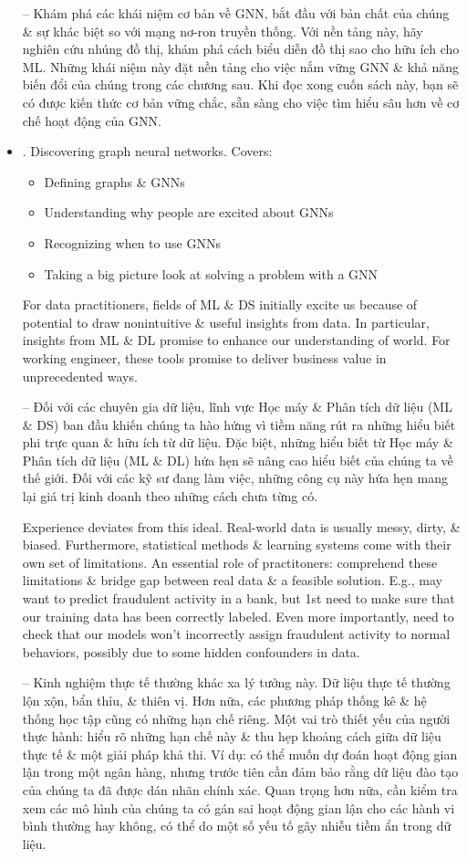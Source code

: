 \documentclass{article}
\begin{document}
\begin{itemize}
    -- Khám phá các khái niệm cơ bản về GNN, bắt đầu với bản chất của chúng \& sự khác biệt so với mạng nơ-ron truyền thống. Với nền tảng này, hãy nghiên cứu nhúng đồ thị, khám phá cách biểu diễn đồ thị sao cho hữu ích cho ML. Những khái niệm này đặt nền tảng cho việc nắm vững GNN \& khả năng biến đổi của chúng trong các chương sau. Khi đọc xong cuốn sách này, bạn sẽ có được kiến thức cơ bản vững chắc, sẵn sàng cho việc tìm hiểu sâu hơn về cơ chế hoạt động của GNN.
    \item {. Discovering graph neural networks.} Covers:
    \begin{itemize}
        \item Defining graphs \& GNNs
        \item Understanding why people are excited about GNNs
        \item Recognizing when to use GNNs
        \item Taking a big picture look at solving a problem with a GNN
    \end{itemize}
    For data practitioners, fields of ML \& DS initially excite us because of potential to draw nonintuitive \& useful insights from data. In particular, insights from ML \& DL promise to enhance our understanding of world. For working engineer, these tools promise to deliver business value in unprecedented ways.

    -- Đối với các chuyên gia dữ liệu, lĩnh vực Học máy \& Phân tích dữ liệu (ML \& DS) ban đầu khiến chúng ta hào hứng vì tiềm năng rút ra những hiểu biết phi trực quan \& hữu ích từ dữ liệu. Đặc biệt, những hiểu biết từ Học máy \& Phân tích dữ liệu (ML \& DL) hứa hẹn sẽ nâng cao hiểu biết của chúng ta về thế giới. Đối với các kỹ sư đang làm việc, những công cụ này hứa hẹn mang lại giá trị kinh doanh theo những cách chưa từng có.

    Experience deviates from this ideal. Real-world data is usually messy, dirty, \& biased. Furthermore, statistical methods \& learning systems come with their own set of limitations. An essential role of practitoners: comprehend these limitations \& bridge gap between real data \& a feasible solution. E.g., may want to predict fraudulent activity in a bank, but 1st need to make sure that our training data has been correctly labeled. Even more importantly, need to check that our models won't incorrectly assign fraudulent activity to normal behaviors, possibly due to some hidden confounders in data.

    -- Kinh nghiệm thực tế thường khác xa lý tưởng này. Dữ liệu thực tế thường lộn xộn, bẩn thỉu, \& thiên vị. Hơn nữa, các phương pháp thống kê \& hệ thống học tập cũng có những hạn chế riêng. Một vai trò thiết yếu của người thực hành: hiểu rõ những hạn chế này \& thu hẹp khoảng cách giữa dữ liệu thực tế \& một giải pháp khả thi. Ví dụ: có thể muốn dự đoán hoạt động gian lận trong một ngân hàng, nhưng trước tiên cần đảm bảo rằng dữ liệu đào tạo của chúng ta đã được dán nhãn chính xác. Quan trọng hơn nữa, cần kiểm tra xem các mô hình của chúng ta có gán sai hoạt động gian lận cho các hành vi bình thường hay không, có thể do một số yếu tố gây nhiễu tiềm ẩn trong dữ liệu.


\end{itemize}
\end{document}
